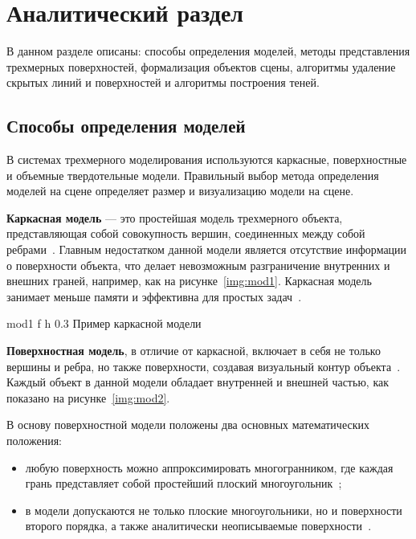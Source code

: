 \chapter{Аналитический раздел}

В данном разделе описаны: способы определения моделей, методы представления трехмерных поверхностей, формализация объектов сцены, алгоритмы удаление скрытых линий и поверхностей и алгоритмы построения теней.

\section{Способы определения моделей}

В системах трехмерного моделирования используются каркасные, поверхностные и объемные твердотельные модели. 
Правильный выбор метода определения моделей на сцене определяет размер и визуализацию модели на сцене.

\textbf{Каркасная модель} --- это простейшая модель трехмерного объекта, представляющая собой совокупность вершин, соединенных между собой ребрами~\cite{model_geom}.
Главным недостатком данной модели является отсутствие информации о поверхности объекта, что делает невозможным разграничение внутренних и внешних граней, например, как на рисунке~\ref{img:mod1}.
Каркасная модель занимает меньше памяти и эффективна для простых задач~\cite{model_geom_01}.
 

	{mod1} %
	{f} %
	{h} %
	{0.3\textwidth} %
	{Пример каркасной модели} %
	

\textbf{Поверхностная модель}, в отличие от каркасной, включает в себя не только вершины и ребра, но также поверхности, создавая визуальный контур объекта~\cite{model_geom}. Каждый объект в данной модели обладает внутренней и внешней частью, как показано на  рисунке~\ref{img:mod2}.

В основу поверхностной модели положены два основных математических положения:
\begin{itemize}
	\item любую поверхность можно аппроксимировать многогранником, где каждая грань представляет собой простейший плоский многоугольник~\cite{model_geom_01};
	\item в модели допускаются не только плоские многоугольники, но и поверхности второго порядка, а также аналитически неописываемые поверхности~\cite{model_geom_01}.
\end{itemize}

